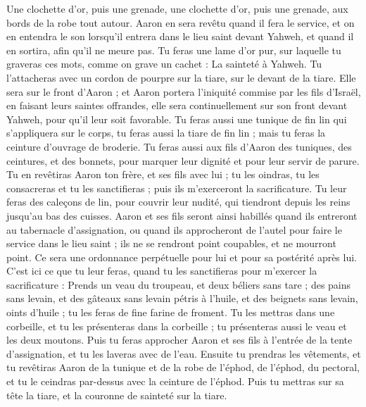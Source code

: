 \begin{multicols}{2}
Une clochette d'or, puis une grenade, une clochette d'or, puis une grenade, aux bords de la robe tout autour.
Aaron en sera revêtu quand il fera le service, et on en entendra le son lorsqu'il entrera dans le lieu saint devant Yahweh, et quand il en sortira, afin qu'il ne meure pas.
Tu feras une lame d’or pur, sur laquelle tu graveras ces mots, comme on grave un cachet : La sainteté à Yahweh.
Tu l’attacheras avec un cordon de pourpre sur la tiare, sur le devant de la tiare.
Elle sera sur le front d'Aaron ; et Aaron portera l'iniquité commise par les fils d’Israël, en faisant leurs saintes offrandes, elle sera continuellement sur son front devant Yahweh, pour qu’il leur soit favorable.
Tu feras aussi une tunique de fin lin qui s'appliquera sur le corps, tu feras aussi la tiare de fin lin ; mais tu feras la ceinture d'ouvrage de broderie.
Tu feras aussi aux fils d'Aaron des tuniques, des ceintures, et des bonnets, pour marquer leur dignité et pour leur servir de parure.
Tu en revêtiras Aaron ton frère, et ses fils avec lui ; tu les oindras, tu les consacreras et tu les sanctifieras ; puis ils m'exerceront la sacrificature.
Tu leur feras des caleçons de lin, pour couvrir leur nudité, qui tiendront depuis les reins jusqu'au bas des cuisses.
Aaron et ses fils seront ainsi habillés quand ils entreront au tabernacle d'assignation, ou quand ils approcheront de l'autel pour faire le service dans le lieu saint ; ils ne se rendront point coupables, et ne mourront point. Ce sera une ordonnance perpétuelle pour lui et pour sa postérité après lui.
\VerseOne{}C'est ici ce que tu leur feras, quand tu les sanctifieras pour m'exercer la sacrificature : Prends un veau du troupeau, et deux béliers sans tare ;
des pains sans levain, et des gâteaux sans levain pétris à l'huile, et des beignets sans levain, oints d'huile ; tu les feras de fine farine de froment.
Tu les mettras dans une corbeille, et tu les présenteras dans la corbeille ; tu présenteras aussi le veau et les deux moutons.
Puis tu feras approcher Aaron et ses fils à l'entrée de la tente d'assignation, et tu les laveras avec de l'eau.
Ensuite tu prendras les vêtements, et tu revêtiras Aaron de la tunique et de la robe de l'éphod, de l'éphod, du pectoral, et tu le ceindras par-dessus avec la ceinture de l'éphod.
Puis tu mettras sur sa tête la tiare, et la couronne de sainteté sur la tiare.

\end{multicols}
